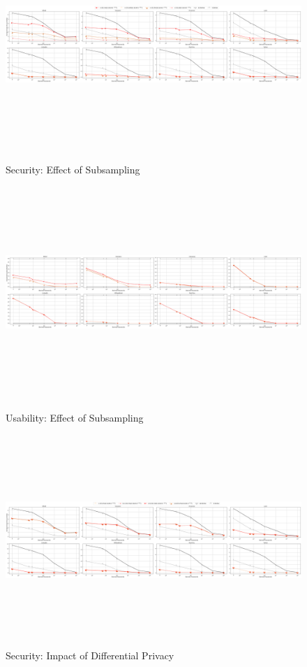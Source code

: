 \begin{figure}
		
	\includegraphics[width=\linewidth, height = 8cm]{Figures/Experiments/Attacker/SecuritySampleCompare}
	\vspace{-0.2in}
	\caption[Security: Selection Optimal Subsamping]{Security: Effect of Subsampling}
	\label{fig:securitysamplecompare}
	
		\includegraphics[width=\linewidth, height = 8cm]{Figures/Experiments/Utility/UsabilitySampleCompare}
	\vspace{-0.2in}
	\caption[Usability: Selection Optimal Subsamping]{Usability: Effect of Subsampling}
	\label{fig:usabilitysamplecompare}

		\includegraphics[width=\linewidth, height = 8cm]{Figures/Experiments/Attacker/SecurityDPCompare}
	\vspace{-0.2in}
	\caption[Security: Impact of Differential Privacy]{Security: Impact of Differential Privacy}
	\label{fig:securitydpcompare}	

\end{figure}
